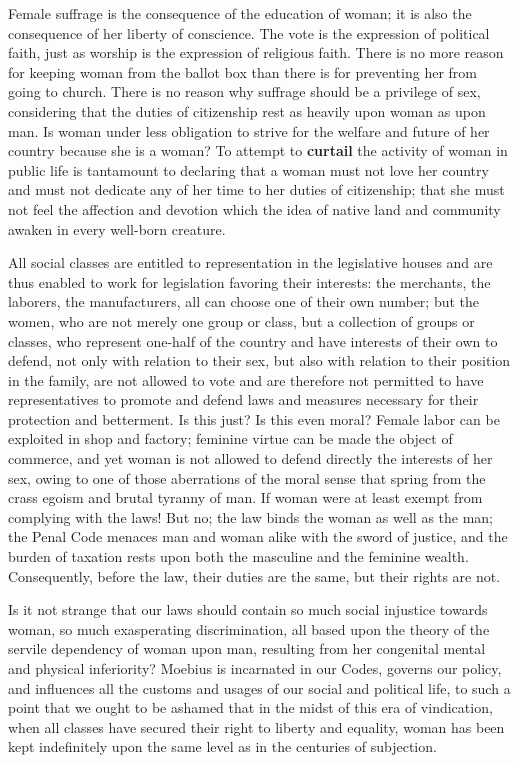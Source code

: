 \begin{linenumbers*}
\indent Female suffrage is the consequence of the education of woman; it is also the consequence of her liberty of conscience. The vote is the expression of political faith, just as worship is the expression of religious faith. There is no more reason for keeping woman from the ballot box than there is for preventing her from going to church. There is no reason why suffrage should be a privilege of sex, considering that the duties of citizenship rest as heavily upon woman as upon man. Is woman under less obligation to strive for the welfare and future of her country because she is a woman? To attempt to \textbf{curtail} the activity of woman in public life is tantamount to declaring that a woman must not love her country and must not dedicate any of her time to her duties of citizenship; that she must not feel the affection and devotion which the idea of native land and community awaken in every well-born creature.


\indent All social classes are entitled to representation in the legislative houses and are thus enabled to work for legislation favoring their interests: the merchants, the laborers, the manufacturers, all can choose one of their own number; but the women, who are not merely one group or class, but a collection of groups or classes, who represent one-half of the country and have interests of their own to defend, not only with relation to their sex, but also with relation to their position in the family, are not allowed to vote and are therefore not permitted to have representatives to promote and defend laws and measures necessary for their protection and betterment. Is this just? Is this even moral? Female labor can be exploited in shop and factory; feminine virtue can be made the object of commerce, and yet woman is not allowed to defend directly the interests of her sex, owing to one of those aberrations of the moral sense that spring from the crass egoism and brutal tyranny of man. If woman were at least exempt from complying with the laws! But no; the law binds the woman as well as the man; the Penal Code menaces man and woman alike with the sword of justice, and the burden of taxation rests upon both the masculine and the feminine wealth. Consequently, before the law, their duties are the same, but their rights are not.

\indent Is it not strange that our laws should contain so much social injustice towards woman, so much exasperating discrimination, all based upon the theory of the servile dependency of woman upon man, resulting from her congenital mental and physical inferiority? Moebius is incarnated in our Codes, governs our policy, and influences all the customs and usages of our social and political life, to such a point that we ought to be ashamed that in the midst of this era of vindication, when all classes have secured their right to liberty and equality, woman has been kept indefinitely upon the same level as in the centuries of subjection.


\end{linenumbers*}

